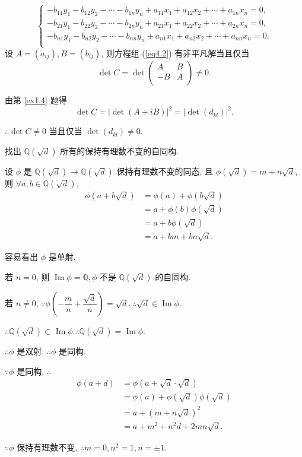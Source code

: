 \documentclass[UTF8]{ctexart}
\begin{document}
\begin{solution}
\begin{equation}
\begin{cases}
            -b_{11}y_1-b_{12}y_2-\cdots-b_{1n}y_n+a_{11}x_1+a_{12}x_2+\cdots+a_{1n}x_n=0, \\
            -b_{21}y_1-b_{22}y_2-\cdots-b_{2n}y_n+a_{21}x_1+a_{22}x_2+\cdots+a_{2n}x_n=0, \\
            -b_{n1}y_1-b_{n2}y_2-\cdots-b_{nn}y_n+a_{n1}x_1+a_{n2}x_2+\cdots+a_{nn}x_n=0. \\
        \end{cases}
    \end{equation}
    设 $A=(a_{ij}),B=(b_{ij})$, 则方程组 (\ref{eq4.2}) 有非平凡解当且仅当
    \[\det C=\det\begin{pmatrix}
        A & B \\
        -B & A \\
    \end{pmatrix}\neq0.\]

    由第 \ref{ex1.4} 题得
    \[\det C=|\det(A+iB)|^2=|\det(d_{kl})|^2.\]

    $\therefore\det C\neq0$ 当且仅当 $\det(d_{kl})\neq0$.
\end{solution}
\begin{exercise}%
    找出 $\mathbb{Q}(\sqrt{d})$ 所有的保持有理数不变的自同构.
\end{exercise}
\begin{solution}
    设 $\phi$ 是 $\mathbb{Q}(\sqrt{d})\to\mathbb{Q}(\sqrt{d})$ 保持有理数不变的同态, 且 $\phi(\sqrt{d})=m+n\sqrt{d}$, 则 $\forall a,b\in\mathbb{Q}(\sqrt{d})$,
    \begin{align*}
        \phi(a+b\sqrt{d}) & =\phi(a)+\phi(b\sqrt{d}) \\
        & =a+\phi(b)\phi(\sqrt{d}) \\
        & =a+b\phi(\sqrt{d}) \\
        & =a+bm+bn\sqrt{d}.
    \end{align*}

    容易看出 $\phi$ 是单射.

    若 $n=0$, 则 $\operatorname{Im}\phi=\mathbb{Q},\phi$ 不是 $\mathbb{Q}(\sqrt{d})$ 的自同构.

    若 $n\neq0$, $\because\phi\left(-\dfrac{m}{n}+\dfrac{\sqrt{d}}{n}\right)=\sqrt{d},\therefore\sqrt{d}\in\operatorname{Im}\phi$.

    $\therefore\mathbb{Q}(\sqrt{d})\subset\operatorname{Im}\phi.\therefore\mathbb{Q}(\sqrt{d})=\operatorname{Im}\phi$.

    $\therefore\phi$ 是双射. $\therefore\phi$ 是同构.

    $\because\phi$ 是同构, $\therefore$
    \begin{align*}
        \phi(a+d) & =\phi(a+\sqrt{d}\cdot\sqrt{d}) \\
        & =\phi(a)+\phi(\sqrt{d})\phi(\sqrt{d}) \\
        & =a+(m+n\sqrt{d})^2 \\
        & =a+m^2+n^2d+2mn\sqrt{d}.
    \end{align*}

    $\because\phi$ 保持有理数不变, $\therefore m=0,n^2=1,n=\pm1$.
\end{solution}
\end{document}
